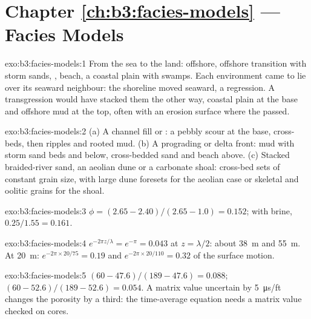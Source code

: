 \section*{Chapter \ref{ch:b3:facies-models} --- Facies Models}

\begin{solution}{exo:b3:facies-models:1}
From the sea to the land: offshore, offshore transition with storm sands,
, beach, a coastal plain with swamps. Each environment came to lie
over its seaward neighbour: the shoreline moved seaward, a regression. A
transgression would have stacked them the other way, coastal plain at the
base and offshore mud at the top, often with an erosion surface where the
 passed.
\end{solution}

\begin{solution}{exo:b3:facies-models:2}
(a) A channel fill or : a pebbly scour at the base, cross-beds,
then ripples and rooted mud. (b) A prograding  or delta front:
mud with storm sand beds and  below,
cross-bedded  sand and beach above. (c) Stacked braided-river
sand, an aeolian dune or a carbonate shoal: cross-bed sets of constant grain
size, with large dune foresets for the aeolian case or skeletal and oolitic
grains for the shoal.
\end{solution}

\begin{solution}{exo:b3:facies-models:3}
$\phi = (2.65 - 2.40)/(2.65 - 1.0) = 0.152$; with brine,
$0.25/1.55 = 0.161$.
\end{solution}

\begin{solution}{exo:b3:facies-models:4}
$e^{-2\pi z/\lambda} = e^{-\pi} = 0.043$ at $z = \lambda/2$: about
\qty{38}{m} and \qty{55}{m}. At \qty{20}{m}: $e^{-2\pi\times20/75} = 0.19$
and $e^{-2\pi\times20/110} = 0.32$ of the surface motion.
\end{solution}

\begin{solution}{exo:b3:facies-models:5}
$(60 - 47.6)/(189 - 47.6) = 0.088$; $(60 - 52.6)/(189 - 52.6) = 0.054$. A
matrix value uncertain by \qty{5}{\micro\second/ft} changes the porosity by
a third: the time-average equation needs a matrix value checked on cores.
\end{solution}

